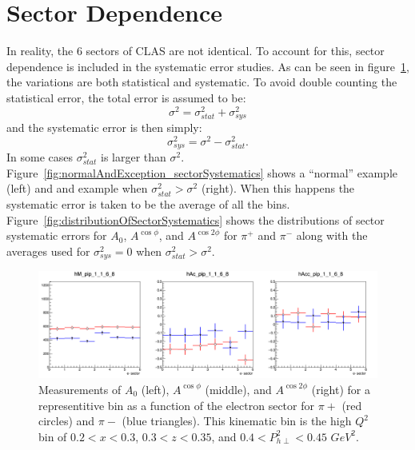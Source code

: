 \section{Sector Dependence}
\label{sec:SectorDependence}
In reality, the 6 sectors of CLAS are not identical.
To account for this, sector dependence is included in the systematic error studies.
As can be seen in figure~\ref{fig:sectorDep_0_1_4_3}, the variations are both statistical and systematic.
To avoid double counting the statistical error, the total error is assumed to be:
%
\begin{equation}
\label{eq:totalError_stat_sys}
\sigma^2 = \sigma^2_{stat} + \sigma^2_{sys}
\end{equation}
%
and the systematic error is then simply:
%
\begin{equation}
\label{eq:sysError_sectorDep}
\sigma^2_{sys} = \sigma^2 - \sigma^2_{stat}.
\end{equation}
%
In some cases $\sigma^2_{stat}$ is larger than $\sigma^2$.
Figure~\ref{fig:normalAndException_sectorSystematics} shows a ``normal'' example (left) and and example when $\sigma^2_{stat} > \sigma^2$ (right).
When this happens the systematic error is taken to be the average of all the bins.
Figure~\ref{fig:distributionOfSectorSystematics} shows the distributions of sector systematic errors for $A_0$, $A^{\cos\phi}$, and $A^{\cos 2\phi}$ for $\pi^+$ and $\pi^-$ along with the averages used for $\sigma^2_{sys} = 0$ when $\sigma^2_{stat} > \sigma^2$.
%
\begin{figure}[htp]
\centering
\includegraphics[width=6in]{figures/sectorDep_1_1_6_8.png}
\caption{Measurements of $A_0$ (left), $A^{\cos\phi}$ (middle), and $A^{\cos2\phi}$ (right) for a representitive bin as a function of the electron sector for $\pi+$ (red circles) and $\pi-$ (blue triangles). This kinematic bin is the high $Q^2$ bin of $0.2 < x < 0.3$, $0.3 < z < 0.35$, and $0.4 < P_{h\perp}^2 < 0.45$ $GeV^2$.}
\label{fig:sectorDep_0_1_4_3}
\end{figure}
%
